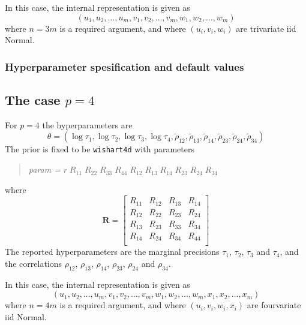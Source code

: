 \documentclass[a4paper,11pt]{article}
\begin{document}
In this case, the internal representation is given as
\begin{displaymath}
    (u_{1}, u_{2}, \ldots, u_{m}, v_{1}, v_{2}, \ldots, v_{m},
    w_{1}, w_{2}, \ldots, w_{m})
\end{displaymath}
where $n=3m$ is a required argument, and where $(u_{i}, v_{i}, w_{i})$
are trivariate iid Normal.

\subsubsection*{Hyperparameter spesification and default values}


\subsection*{The case $p=4$}

For $p=4$ the
hyperparameters are
\begin{displaymath}
    \theta = (\log \tau_{1}, \log \tau_{2}, \log \tau_{3}, \log \tau_{4},
    \tilde\rho_{12},
    \tilde\rho_{13},
    \tilde\rho_{14},
    \tilde\rho_{23},
    \tilde\rho_{24},
    \tilde\rho_{34})
\end{displaymath}
The prior is fixed to be \texttt{wishart4d} with parameters
\begin{quote}
    \emph{param = } $r\;R_{11}\;R_{22}\;R_{33}\; R_{44}\;
    R_{12}\;
    R_{13}\;
    R_{14}\;
    R_{23}\;
    R_{24}\;
    R_{34}$
\end{quote}
where
\begin{displaymath}
    \mathbf{R} =
    \left[\begin{array}{cccc}
        R_{11} &R_{12} & R_{13} & R_{14}\\
        R_{12} & R_{22} & R_{23} & R_{24}\\
        R_{13} & R_{23} & R_{33} & R_{34}\\
        R_{14} & R_{24} & R_{34} & R_{44}\\
    \end{array}\right]
\end{displaymath}
The reported hyperparameters are the marginal precisions $\tau_{1}$,
$\tau_{2}$, $\tau_{3}$ and $\tau_{4}$, and the correlations
$\rho_{12}$, $\rho_{13}$, $\rho_{14}$, $\rho_{23}$, $\rho_{24}$ and
$\rho_{34}$.

In this case, the internal representation is given as
\begin{displaymath}
    (u_{1}, u_{2}, \ldots, u_{m}, v_{1}, v_{2}, \ldots, v_{m},
    w_{1}, w_{2}, \ldots, w_{m},
    x_{1}, x_{2}, \ldots, x_{m})
\end{displaymath}
where $n=4m$ is a required argument, and where $(u_{i}, v_{i}, w_{i}, x_{i})$
are fourvariate iid Normal.
\end{document}
